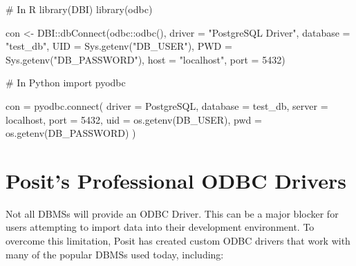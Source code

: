 \documentclass[
  letterpaper,
  DIV=11,
  numbers=noendperiod]{scrreprt}
\newenvironment{Shaded}{\begin{snugshade}}{\end{snugshade}}
\newcommand{\AttributeTok}[1]{\textcolor[rgb]{0.40,0.45,0.13}{#1}}
\newcommand{\CommentTok}[1]{\textcolor[rgb]{0.37,0.37,0.37}{#1}}
\newcommand{\DecValTok}[1]{\textcolor[rgb]{0.68,0.00,0.00}{#1}}
\newcommand{\ExtensionTok}[1]{\textcolor[rgb]{0.00,0.23,0.31}{#1}}
\newcommand{\FunctionTok}[1]{\textcolor[rgb]{0.28,0.35,0.67}{#1}}
\newcommand{\ImportTok}[1]{\textcolor[rgb]{0.00,0.46,0.62}{#1}}
\newcommand{\NormalTok}[1]{\textcolor[rgb]{0.00,0.23,0.31}{#1}}
\newcommand{\OperatorTok}[1]{\textcolor[rgb]{0.37,0.37,0.37}{#1}}
\newcommand{\OtherTok}[1]{\textcolor[rgb]{0.00,0.23,0.31}{#1}}
\newcommand{\SpecialCharTok}[1]{\textcolor[rgb]{0.37,0.37,0.37}{#1}}
\newcommand{\StringTok}[1]{\textcolor[rgb]{0.13,0.47,0.30}{#1}}
\begin{document}
\begin{Shaded}
\begin{Highlighting}[]
\CommentTok{\# In R}
\FunctionTok{library}\NormalTok{(DBI)}
\FunctionTok{library}\NormalTok{(odbc)}

\NormalTok{con }\OtherTok{\textless{}{-}}\NormalTok{ DBI}\SpecialCharTok{::}\FunctionTok{dbConnect}\NormalTok{(odbc}\SpecialCharTok{::}\FunctionTok{odbc}\NormalTok{(),}
  \AttributeTok{driver =} \StringTok{"PostgreSQL Driver"}\NormalTok{,}
  \AttributeTok{database =} \StringTok{"test\_db"}\NormalTok{,}
  \AttributeTok{UID    =} \FunctionTok{Sys.getenv}\NormalTok{(}\StringTok{"DB\_USER"}\NormalTok{),}
  \AttributeTok{PWD    =} \FunctionTok{Sys.getenv}\NormalTok{(}\StringTok{"DB\_PASSWORD"}\NormalTok{),}
  \AttributeTok{host =} \StringTok{"localhost"}\NormalTok{,}
  \AttributeTok{port =} \DecValTok{5432}\NormalTok{)}
\end{Highlighting}
\end{Shaded}

\begin{Shaded}
\begin{Highlighting}[]
\CommentTok{\# In Python}
\ImportTok{import}\NormalTok{ pyodbc}

\NormalTok{con }\OperatorTok{=}\NormalTok{ pyodbc.}\ExtensionTok{connect}\NormalTok{(}
\NormalTok{  driver }\OperatorTok{=} \StringTok{\textquotesingle{}PostgreSQL\textquotesingle{}}\NormalTok{,}
\NormalTok{  database }\OperatorTok{=} \StringTok{\textquotesingle{}test\_db\textquotesingle{}}\NormalTok{,}
\NormalTok{  server }\OperatorTok{=} \StringTok{\textquotesingle{}localhost\textquotesingle{}}\NormalTok{,}
\NormalTok{  port }\OperatorTok{=} \DecValTok{5432}\NormalTok{, }
\NormalTok{  uid }\OperatorTok{=}\NormalTok{ os.getenv(}\StringTok{\textquotesingle{}DB\_USER\textquotesingle{}}\NormalTok{),}
\NormalTok{  pwd }\OperatorTok{=}\NormalTok{ os.getenv(}\StringTok{\textquotesingle{}DB\_PASSWORD\textquotesingle{}}\NormalTok{)}
\NormalTok{)}
\end{Highlighting}
\end{Shaded}

\section{Posit's Professional ODBC
Drivers}\label{posits-professional-odbc-drivers}

Not all DBMSs will provide an ODBC Driver. This can be a major blocker
for users attempting to import data into their development environment.
To overcome this limitation, Posit has created custom ODBC drivers that
work with many of the popular DBMSs used today, including:
\end{document}
